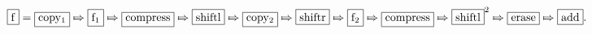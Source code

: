 \begin{solution}
$\machine{f}=\machine{copy_1}\concat \machine{f_1} \concat \machine{compress} \concat \machine{shiftl} \concat \machine{copy_2} \concat \machine{shiftr} \concat \machine{f_2} \concat\machine{compress} \concat\machine{shiftl}^2 \concat \machine{erase} \concat\machine{add}.$
\end{solution}